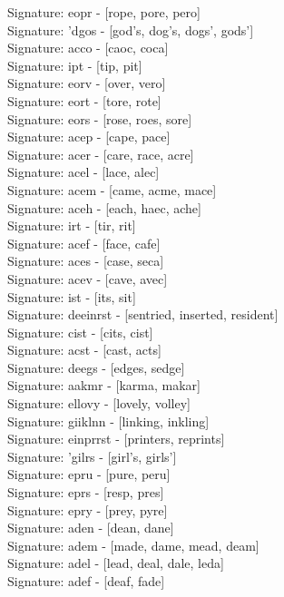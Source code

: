 Signature: {eopr} - [rope, pore, pero] \\
Signature: {'dgos} - [god's, dog's, dogs', gods'] \\
Signature: {acco} - [caoc, coca] \\
Signature: {ipt} - [tip, pit] \\
Signature: {eorv} - [over, vero] \\
Signature: {eort} - [tore, rote] \\
Signature: {eors} - [rose, roes, sore] \\
Signature: {acep} - [cape, pace] \\
Signature: {acer} - [care, race, acre] \\
Signature: {acel} - [lace, alec] \\
Signature: {acem} - [came, acme, mace] \\
Signature: {aceh} - [each, haec, ache] \\
Signature: {irt} - [tir, rit] \\
Signature: {acef} - [face, cafe] \\
Signature: {aces} - [case, seca] \\
Signature: {acev} - [cave, avec] \\
Signature: {ist} - [its, sit] \\
Signature: {deeinrst} - [sentried, inserted, resident] \\
Signature: {cist} - [cits, cist] \\
Signature: {acst} - [cast, acts] \\
Signature: {deegs} - [edges, sedge] \\
Signature: {aakmr} - [karma, makar] \\
Signature: {ellovy} - [lovely, volley] \\
Signature: {giiklnn} - [linking, inkling] \\
Signature: {einprrst} - [printers, reprints] \\
Signature: {'gilrs} - [girl's, girls'] \\
Signature: {epru} - [pure, peru] \\
Signature: {eprs} - [resp, pres] \\
Signature: {epry} - [prey, pyre] \\
Signature: {aden} - [dean, dane] \\
Signature: {adem} - [made, dame, mead, deam] \\
Signature: {adel} - [lead, deal, dale, leda] \\
Signature: {adef} - [deaf, fade] \\
